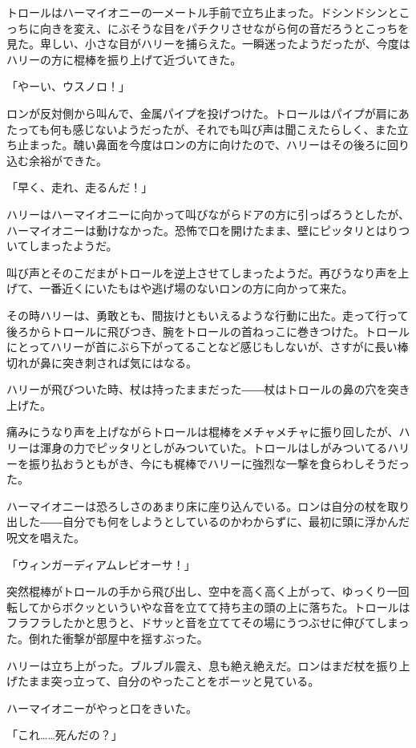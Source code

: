 \documentclass[10pt,a4paper]{article}
\begin{document}
\begin{CJK}{UTF8}{min}
トロールはハーマイオニーの一メートル手前で立ち止まった。ドシンドシンとこっちに向きを変え、にぶそうな目をパチクリさせながら何の音だろうとこっちを見た。卑しい、小さな目がハリーを捕らえた。一瞬迷ったようだったが、今度はハリーの方に棍棒を振り上げて近づいてきた。

「やーい、ウスノロ！」

ロンが反対側から叫んで、金属パイプを投げつけた。トロールはパイプが肩にあたっても何も感じないようだったが、それでも叫び声は聞こえたらしく、また立ち止まった。醜い鼻面を今度はロンの方に向けたので、ハリーはその後ろに回り込む余裕ができた。

「早く、走れ、走るんだ！」

ハリーはハーマイオニーに向かって叫びながらドアの方に引っぱろうとしたが、ハーマイオニーは動けなかった。恐怖で口を開けたまま、壁にピッタリとはりついてしまったようだ。

叫び声とそのこだまがトロールを逆上させてしまったようだ。再びうなり声を上げて、一番近くにいたもはや逃げ場のないロンの方に向かって来た。

その時ハリーは、勇敢とも、間抜けともいえるような行動に出た。走って行って後ろからトロールに飛びつき、腕をトロールの首ねっこに巻きつけた。トロールにとってハリーが首にぶら下がってることなど感じもしないが、さすがに長い棒切れが鼻に突き刺されば気にはなる。

ハリーが飛びついた時、杖は持ったままだった――杖はトロールの鼻の穴を突き上げた。

痛みにうなり声を上げながらトロールは棍棒をメチャメチャに振り回したが、ハリーは渾身の力でピッタリとしがみついていた。トロールはしがみついてるハリーを振り払おうともがき、今にも梶棒でハリーに強烈な一撃を食らわしそうだった。

ハーマイオニーは恐ろしさのあまり床に座り込んでいる。ロンは自分の杖を取り出した――自分でも何をしようとしているのかわからずに、最初に頭に浮かんだ呪文を唱えた。

「ウィンガーディアムレビオーサ！」

突然棍棒がトロールの手から飛び出し、空中を高く高く上がって、ゆっくり一回転してからボクッといういやな音を立てて持ち主の頭の上に落ちた。トロールはフラフラしたかと思うと、ドサッと音を立ててその場にうつぶせに伸びてしまった。倒れた衝撃が部屋中を揺すぶった。

ハリーは立ち上がった。ブルブル震え、息も絶え絶えだ。ロンはまだ杖を振り上げたまま突っ立って、自分のやったことをボーッと見ている。

ハーマイオニーがやっと口をきいた。

「これ……死んだの？」


\end{CJK}
\end{document}
